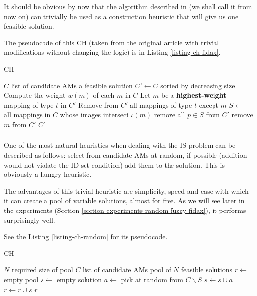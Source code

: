 It should be obvious by now that the algorithm described in \cite{fidax} (we shall call it  from now on) can trivially be used as a construction heuristic that will give us one feasible solution.

The pseudocode of this CH (taken from the original article with trivial modifications without changing the logic) is in Listing \ref{listing-ch-fidax}.

\begin{algorithm}
\caption{ CH}
\label{listing-ch-fidax}
\begin{algorithmic}
\REQUIRE $C$ list of candidate AMs
\ENSURE a feasible solution
\STATE $C' \gets C$ sorted by decreasing size
\STATE Compute the weight $w(m)$ of each $m$ in $C$
  \STATE Let $m$ be a \textbf{highest-weight} mapping of type $t$ in $C'$
  \STATE Remove from $C'$ all mappings of type $t$ except $m$
\ENDFOR
{}
  \STATE $S \gets$ all mappings in $C$ whose images intersect $\iota(m)$
    \STATE remove all $p \in S$ from $C'$
  \ELSE
    \STATE remove $m$ from $C'$
  \ENDIF
\ENDFOR
\RETURN $C'$
\end{algorithmic}
\end{algorithm}

\subsubsection{}
\label{heu-ch-random}

One of the most natural heuristics when dealing with the IS problem can be described as follows: select from candidate AMs at random, if possible (addition would not violate the ID set condition) add them to the solution. This is obviously a hungry heuristic. %

The advantages of this trivial heuristic are simplicity, speed and ease with which it can create a pool of variable solutions, almost for free. As we will see later in the experiments (Section \ref{section-experiments-random-fuzzy-fidax}), it performs surprisingly well.

See the Listing \ref{listing-ch-random} for its pseudocode.

\begin{algorithm}
\caption{ CH}
\label{listing-ch-random}
\begin{algorithmic}
\REQUIRE $N$ required size of pool
\REQUIRE $C$ list of candidate AMs
\ENSURE pool of $N$ feasible solutions
\STATE $r \gets $ empty pool
  \STATE {}
  \STATE $s \gets $ empty solution
    \STATE $a \gets $ pick at random from $C \backslash S$
    \STATE $s \gets s \cup a$
  \ENDWHILE
  \STATE $r \gets r \cup s$
\ENDFOR
\RETURN $r$
\end{algorithmic}
\end{algorithm}

